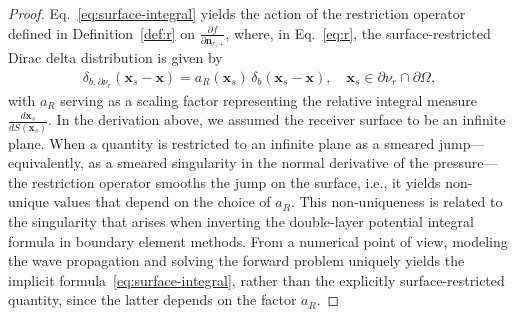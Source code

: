 \documentclass[10pt,a4paper]{amsart}
\newcommand{\bn}{\boldsymbol{n}}
\newcommand{\bx}{\boldsymbol{x}}
\begin{document}
\begin{proof}
\noindent
Eq.~\eqref{eq:surface-integral} yields the action of the restriction operator 
defined in Definition~\ref{def:r} on \(\tfrac{\partial f}{\partial \bn_{r,+}}\), 
where, in Eq.~\eqref{eq:r}, the surface-restricted Dirac delta distribution is 
given by
\begin{align}  \label{eq:dirac-delta-surface}
    \delta_{b,\partial \nu_r}(\bx_s - \bx) 
    = a_R(\bx_s)  \, \delta_b(\bx_s - \bx),\quad \bx_s \in \partial \nu_r \cap \partial \Omega ,
\end{align}
with \( a_R \) serving as a scaling factor representing the relative integral measure \( \frac{d \bx_s}{dS(\bx_s)} \). In the derivation above, we assumed the receiver surface to be an infinite plane. When a quantity is restricted to an infinite plane as a smeared jump—equivalently, as a smeared singularity in the normal derivative of the pressure—the restriction operator smooths the jump on the surface, i.e., it yields non-unique values that depend on the choice of \( a_R \). This non-uniqueness is related to the singularity that arises when inverting the double-layer potential integral formula in boundary element methods. From a numerical point of view, modeling the wave propagation and solving the forward problem uniquely yields the implicit formula~\eqref{eq:surface-integral}, rather than the explicitly surface-restricted quantity, since the latter depends on the factor \( a_R \).


\end{proof}
\end{document}
